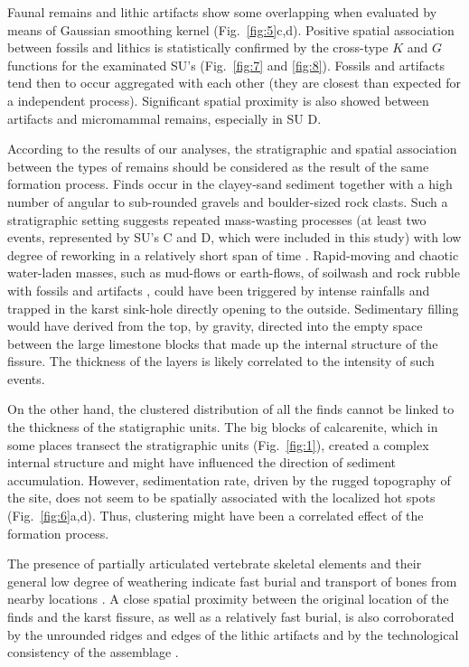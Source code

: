 \documentclass[review,authoryear]{elsarticle} %
\begin{document}
Faunal remains and lithic artifacts show some overlapping when evaluated by means of Gaussian smoothing kernel (Fig.~\ref{fig:5}c,d). Positive spatial association between fossils and lithics is statistically confirmed by the cross-type $K$  and $G$ functions for the examinated SU's (Fig.~\ref{fig:7} and \ref{fig:8}). Fossils and artifacts tend then to occur aggregated with each other (they are closest than expected for a independent process). Significant spatial proximity is also showed between artifacts and micromammal remains, especially in SU D.

According to the results of our analyses, the stratigraphic and spatial association between the types of remains should be considered as the result of the same formation process. Finds occur in the clayey-sand sediment together with a high number of angular to sub-rounded gravels and boulder-sized rock clasts. Such a stratigraphic setting suggests repeated mass-wasting processes (at least two events, represented by SU's C and D, which were included in this study) with low degree of reworking in a relatively short span of time \citep{Arzarello2012}. Rapid-moving and chaotic water-laden masses, such as mud-flows or earth-flows, of soilwash and rock rubble with fossils and artifacts \citep[p.~46]{Butzer1982}, could have been triggered by intense rainfalls and trapped in the karst sink-hole directly opening to the outside. Sedimentary filling would have derived from the top, by gravity, directed into the empty space between the large limestone blocks that made up the internal structure of the fissure. The thickness of the layers is likely correlated to the intensity of such events.

On the other hand, the clustered distribution of all the finds cannot be linked to the thickness of the statigraphic units. The big blocks of calcarenite, which in some places transect the stratigraphic units (Fig.~\ref{fig:1}), created a complex internal structure and might have influenced the direction of sediment accumulation. However, sedimentation rate, driven by the rugged topography of the site, does not seem to be spatially associated with the localized hot spots (Fig.~\ref{fig:6}a,d). Thus, clustering might have been a correlated effect of the formation process.

The presence of partially articulated vertebrate skeletal elements and their general low degree of weathering indicate fast burial and transport of bones from nearby locations \citep{Bagnus2011}. A close spatial proximity between the original location of the finds and the karst fissure, as well as a relatively fast burial, is also corroborated by the unrounded ridges and edges of the lithic artifacts and by the technological consistency of the assemblage \citep{Arzarello2014}.
\end{document}
